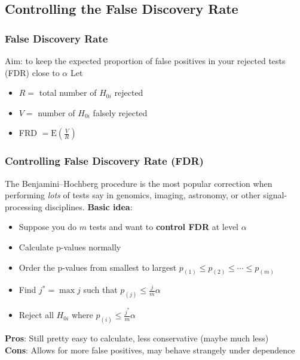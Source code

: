 \documentclass[a4paper]{article}\usepackage[]{graphicx}\usepackage[]{xcolor}
\begin{document}
\subsection{Controlling the False Discovery Rate}
\subsubsection{False Discovery Rate}
Aim: to keep the expected proportion of false positives in your rejected tests (FDR) close to \( \alpha \)
Let
\begin{itemize}
	\item \( R = \) total number of \( H_{0i} \) rejected
	\item \( V = \) number of \( H_{0i} \) falsely rejected
	\item FRD \( = \mathrm{E}\left( \frac{V}{R} \right) \) 
\end{itemize}
\subsubsection{Controlling False Discovery Rate (FDR)}
The \textcolor{myred}{Benjamini--Hochberg} procedure is the most popular correction when performing \textit{lots} of tests say in genomics, imaging, astronomy, or other signal-processing disciplines.
\textbf{Basic idea}:
	\begin{itemize}
		\item Suppose you do \( m \) tests and want to \textbf{control FDR} at level \( \alpha \)
		\item Calculate p-values normally
		\item Order the p-values from smallest to largest \( p_{(1)} \leq p_{(2)} \leq \dotsb \leq p_{(m)} \)
		\item Find \( j^\ast = \max j \) such that \( p_{(j)} \leq \frac{j}{m} \alpha \)
		\item Reject all \( H_{0i} \) where \( p_{(i)} \leq \frac{j^\ast}{m} \alpha \)
	\end{itemize}
\textbf{Pros}: Still pretty easy to calculate, less conservative (maybe much less)\\
\textbf{Cons}: Allows for more false positives, may behave strangely under dependence
\end{document}
